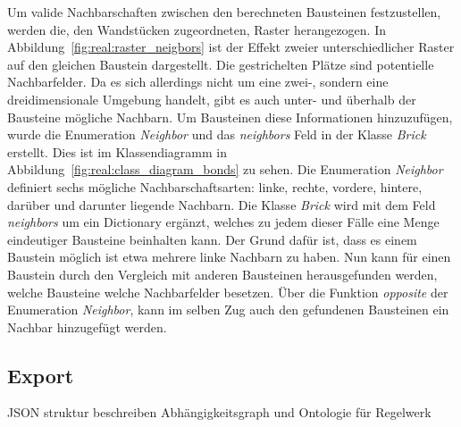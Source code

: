 Um valide Nachbarschaften zwischen den berechneten Bausteinen festzustellen, werden die, den Wandstücken zugeordneten, Raster herangezogen.
In Abbildung~\ref{fig:real:raster_neigbors} ist der Effekt zweier unterschiedlicher Raster auf den gleichen Baustein dargestellt.
Die gestrichelten Plätze sind potentielle Nachbarfelder.
Da es sich allerdings nicht um eine zwei-, sondern eine dreidimensionale Umgebung handelt, gibt es auch unter- und überhalb der Bausteine mögliche Nachbarn.
Um Bausteinen diese Informationen hinzuzufügen, wurde die Enumeration \textit{Neighbor} und das \textit{neighbors} Feld in der Klasse \textit{Brick} erstellt.
Dies ist im Klassendiagramm in Abbildung~\ref{fig:real:class_diagram_bonds} zu sehen.
Die Enumeration \textit{Neighbor} definiert sechs mögliche Nachbarschaftsarten: linke, rechte, vordere, hintere, darüber und darunter liegende Nachbarn.
Die Klasse \textit{Brick} wird mit dem Feld \textit{neighbors} um ein Dictionary ergänzt, welches zu jedem dieser Fälle eine Menge eindeutiger Bausteine beinhalten kann.
Der Grund dafür ist, dass es einem Baustein möglich ist etwa mehrere linke Nachbarn zu haben.
Nun kann für einen Baustein durch den Vergleich mit anderen Bausteinen herausgefunden werden, welche Bausteine welche Nachbarfelder besetzen.
Über die Funktion \textit{opposite} der Enumeration \textit{Neighbor}, kann im selben Zug auch den gefundenen Bausteinen ein Nachbar hinzugefügt werden.


\subsection{Export}\label{real:export}
JSON struktur beschreiben
Abhängigkeitsgraph und Ontologie für Regelwerk
